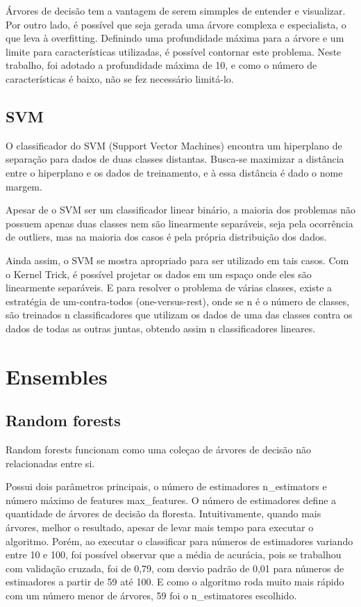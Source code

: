 \documentclass[conference]{IEEEtran}
\begin{document}
Árvores de decisão tem a vantagem de serem simmples de entender e visualizar.
Por outro lado, é possível que seja gerada uma árvore complexa e especialista,
o que leva à overfitting. Definindo uma profundidade máxima para a árvore e um
limite para características utilizadas, é possível contornar este problema.
Neste trabalho, foi adotado a profundidade máxima de 10, e como o número de
características é baixo, não se fez necessário limitá-lo.

\subsection{SVM}

O classificador do SVM (Support Vector Machines) encontra um hiperplano de
separação para dados de duas classes distantas. Busca-se maximizar a distância
entre o hiperplano e os dados de treinamento, e à essa distância é dado o nome
margem.

Apesar de o SVM ser um classificador linear binário, a maioria dos
problemas não possuem apenas duas classes nem são linearmente separáveis, seja
pela ocorrência de outliers, mas na maioria dos casos é pela própria
distribuição dos dados.

Ainda assim, o SVM se mostra apropriado para ser utilizado em tais casos. Com o
Kernel Trick, é possível projetar os dados em um espaço onde eles são
linearmente separáveis. E para resolver o problema de várias classes, existe a
estratégia de um-contra-todos (one-versus-rest), onde se n é o número de
classes, são treinados n classificadores que utilizam os dados de uma das
classes contra os dados de todas as outras juntas, obtendo assim n
classificadores lineares.


\section{Ensembles}

\subsection{Random forests}

Random forests funcionam como uma coleçao de árvores de decisão não
relacionadas entre si.

Possui dois parâmetros principais, o número de estimadores n\_estimators e
número máximo de features max\_features. O número de estimadores define a
quantidade de árvores de decisão da floresta. Intuitivamente, quando mais
árvores, melhor o resultado, apesar de levar mais tempo para executar o
algoritmo. Porém, ao executar o classificar para números de estimadores
variando entre 10 e 100, foi possível observar que a média de acurácia, pois se
trabalhou com validação cruzada, foi de 0,79, com desvio padrão de 0,01 para
números de estimadores a partir de 59 até 100. E como o algoritmo roda muito
mais rápido com um número menor de árvores, 59 foi o n\_estimatores escolhido.
\end{document}
